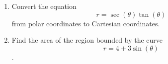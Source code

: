 \documentclass[12pt]{article}
\begin{document}
\begin{enumerate}
\item
Convert the equation $$r = \sec(\theta)\tan(\theta)$$ from polar coordinates to Cartesian coordinates.

\vspace{3in}

\item
Find the area of the region bounded by the curve $$r = 4+3\sin(\theta)$$.

\end{enumerate}
\end{document}
